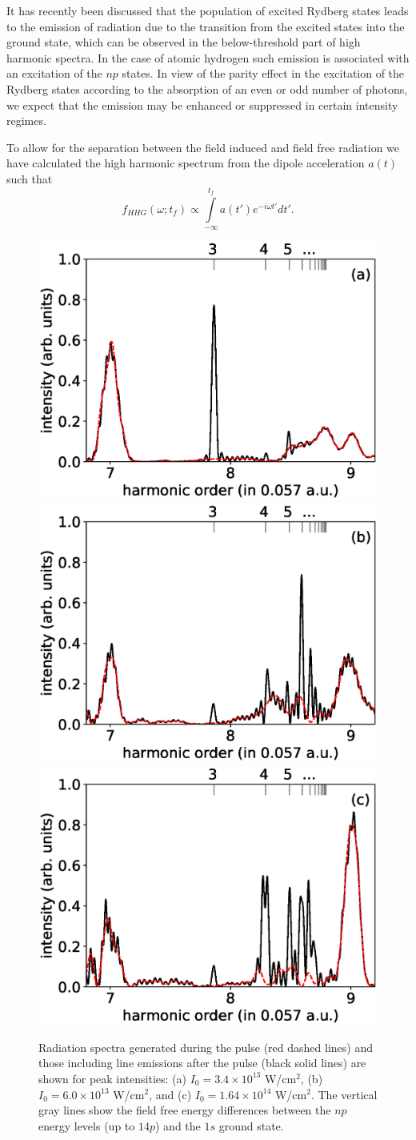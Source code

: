 It has recently been discussed \cite{chini2014,camp2015,beaulieu2016} that the population of excited Rydberg states leads to the emission of radiation due to the transition from the excited states into the ground state, which can be observed in the below-threshold part of high harmonic spectra. In the case of atomic hydrogen such emission is associated with an excitation of the $np$ states. In view of the parity effect in the excitation of the Rydberg states according to the absorption of an even or odd number of photons, we expect that the emission may be enhanced or suppressed in certain intensity regimes.

To allow for the separation between the field induced and field free radiation we have calculated the high harmonic spectrum from the dipole acceleration $a(t)$ such that
%
\begin{equation}
f_{HHG}(\omega; t_f)  \propto \int\limits_{-\infty}^{t_f}  a(t') e^{-i\omega t'} dt'.
\end{equation}

\begin{figure}[!ht]
\centering
\includegraphics[width=0.32\columnwidth]{figs/Rydberg/HHG_3p4e13.eps}
\includegraphics[width=0.32\columnwidth]{figs/Rydberg/HHG_6p0e13.eps}
\includegraphics[width=0.32\columnwidth]{figs/Rydberg/HHG_16p4e13.eps}
\caption{Radiation spectra generated during the pulse (red dashed lines) and those including line emissions after the pulse (black solid lines) are shown for peak intensities:
(a) $I_0 = 3.4\times10^{13}$ W/cm$^2$, 
(b) $I_0 = 6.0\times10^{13}$ W/cm$^2$, and
(c) $I_0 = 1.64\times10^{14}$ W/cm$^2$.
The vertical gray lines show the field free energy differences between the $np$ energy levels (up to $14p$) and the $1s$ ground state. 
}
\label{fig:HHG_6_10}
\end{figure}

